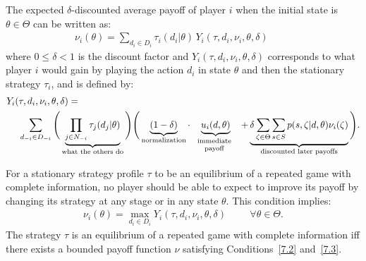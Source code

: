 The expected $\delta$-discounted average payoff of player $i$ when the initial state is $\theta \in \Theta$ can be written as:
\begin{align}
	\nu_i(\theta) = \sum_{d_i \in D_i} \tau_i(d_i|\theta) \, Y_i(\tau , d_i , \nu_i , \theta , \delta) \hspace{1cm}
	\label{7.2}
\end{align}
where $0 \leq \delta < 1$ is the discount factor and $Y_i(\tau , d_i , \nu_i , \theta , \delta)$ corresponds to what player $i$ would gain by playing the action $d_i$ in state $\theta$ and then the stationary strategy $\tau_i$, and is defined by:
\begin{align*}
	Y_i(&\tau , d_i , \nu_i , \theta , \delta) = \\ &\sum_{d_{-i} \in D_{-i}} \Bigg( \underbrace{\prod_{j \in N_{-i}} \tau_j(d_j|\theta)}_{\text{what the others do}} \Bigg)\Bigg( \underbrace{(1-\delta)}_{\text{normalization}} \cdot \underbrace{u_i(d,\theta)}_{\begin{minipage}{1.8cm}\scriptsize\text{\begin{tabular}{c} immediate \\ payoff \end{tabular}}\end{minipage}}+ \underbrace{\delta \sum_{\zeta \in \Theta} \sum_{s \in S}p(s, \zeta|d,\theta)\nu_i(\zeta)}_{\text{discounted later payoffs}} \Bigg).
\end{align*}

For a stationary strategy profile $\tau$ to be an equilibrium of a repeated game with complete information, no player should be able to expect to improve its payoff by changing its strategy at any stage or in any state $\theta$. This condition implies:
\begin{align}
	\nu_i(\theta)= \max_{d_i \in D_i} Y_i(\tau , d_i , \nu_i , \theta , \delta) \hspace{1cm} \forall \theta \in \Theta.
	\label{7.3}
\end{align}
The strategy $\tau$ is an equilibrium of a repeated game with complete information iff there exists a bounded payoff function $\nu$ satisfying Conditions~\eqref{7.2} and~\eqref{7.3}.



\ifx \globalmark \undefined %


	
\else 
	
\fi
